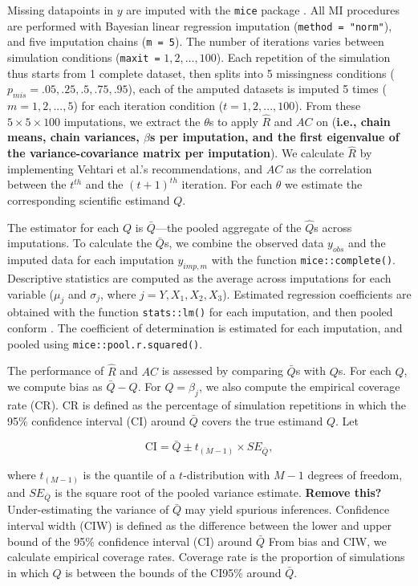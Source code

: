 \documentclass[Royal,times,sageh]{sagej}
\begin{document}
Missing datapoints in \(y\) are imputed with the \texttt{mice} package
\citep{mice}. All MI procedures are performed with Bayesian linear
regression imputation (\texttt{method\ =\ "norm"}), and five imputation
chains (\texttt{m\ =\ 5}). The number of iterations varies between
simulation conditions (\texttt{maxit\ =} \(1, 2, \dots, 100\)). Each
repetition of the simulation thus starts from 1 complete dataset, then
splits into 5 missingness conditions (\(p_{mis} =.05,.25,.5,.75,.95\)),
each of the amputed datasets is imputed 5 times (\(m = 1, 2,..., 5\))
for each iteration condition (\(t = 1, 2,..., 100\)). From these
\(5\times5\times100\) imputations, we extract the \(\theta\)s to apply
\(\widehat{R}\) and \(AC\) on (\textbf{i.e., chain means, chain
variances, \(\beta\)s per imputation, and the first eigenvalue of the
variance-covariance matrix per imputation}). We calculate
\(\widehat{R}\) by implementing Vehtari et al.'s \citeyearpar{veht19}
recommendations, and \(AC\) as the correlation between the \(t^{th}\)
and the \((t+1)^{th}\) iteration. For each \(\theta\) we estimate the
corresponding scientific estimand \(Q\).

The estimator for each \(Q\) is \(\bar{Q}\)---the pooled aggregate of
the \(\hat{Q}\)s across imputations. To calculate the \(\bar{Q}\)s, we
combine the observed data \(y_{obs}\) and the imputed data for each
imputation \(y_{imp,m}\) with the function \texttt{mice::complete()}.
Descriptive statistics are computed as the average across imputations
for each variable (\(\mu_j\) and \(\sigma_j\), where
\(j = Y, X_1, X_2, X_3\)). Estimated regression coefficients are
obtained with the function \texttt{stats::lm()} for each imputation, and
then pooled conform \citet{vink14}. The coefficient of determination is
estimated for each imputation, and pooled using
\texttt{mice::pool.r.squared()}.

The performance of \(\widehat{R}\) and \(AC\) is assessed by comparing
\(\bar{Q}\)s with \(Q\)s. For each \(Q\), we compute bias as
\(\bar{Q} - Q\). For \(Q=\beta_j\), we also compute the empirical
coverage rate (CR). CR is defined as the percentage of simulation
repetitions in which the 95\% confidence interval (CI) around
\(\bar{Q}\) covers the true estimand \(Q\). Let

\[\text{CI} = \bar{Q} \pm t_{(M-1)} \times SE_{\bar{Q}},\]

where \(t_{(M-1)}\) is the quantile of a \(t\)-distribution with \(M-1\)
degrees of freedom, and \(SE_{\bar{Q}}\) is the square root of the
pooled variance estimate. \textbf{Remove this? } Under-estimating the
variance of \(\bar{Q}\) may yield spurious inferences. Confidence
interval width (CIW) is defined as the difference between the lower and
upper bound of the 95\% confidence interval (CI) around \(\bar{Q}\) From
bias and CIW, we calculate empirical coverage rates. Coverage rate is
the proportion of simulations in which \(Q\) is between the bounds of
the CI95\% around \(\bar{Q}\).
\end{document}
